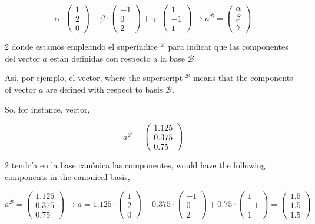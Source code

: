 \begin{equation*}
\alpha \cdot \begin{pmatrix}
1\\
2\\
0
\end{pmatrix}+\beta \cdot \begin{pmatrix}
-1\\
0\\
2
\end{pmatrix}+ \gamma \cdot \begin{pmatrix}
1\\
-1\\
1
\end{pmatrix} \rightarrow a^{\mathcal{B}}=\begin{pmatrix}
\alpha \\
\beta \\
\gamma
\end{pmatrix}
\end{equation*} 
\begin{paracol}{2}
donde estamos empleando el superíndice $^{\mathcal{B}}$ para indicar que las componentes del vector $a$ están definidas con respecto a la base $\mathcal{B}$.

Así, por ejemplo, el vector,
\switchcolumn
where the superscript $^{\mathcal{B}}$ means that the components of vector $a$ are defined with respect to basis $\mathcal{B}$.

So, for instance, vector,
\end{paracol} 
\begin{equation*}
a^{\mathcal{B}}=\begin{pmatrix}
1.125\\
0.375\\
0.75
\end{pmatrix}
\end{equation*}
\begin{paracol}{2}
tendría en la base canónica las componentes,
\switchcolumn
would have the following components in the canonical basis,
\end{paracol}
\begin{equation*}
a^{\mathcal{B}}=\begin{pmatrix}
1.125\\
0.375\\
0.75
\end{pmatrix} \rightarrow a= 1.125 \cdot \begin{pmatrix}
1\\
2\\
0
\end{pmatrix}+0.375 \cdot \begin{pmatrix}
-1\\
0\\
2
\end{pmatrix}+ 0.75 \cdot \begin{pmatrix}
1\\
-1\\
1
\end{pmatrix} =\begin{pmatrix}
1.5\\
1.5 \\
1.5
\end{pmatrix}
\end{equation*}

